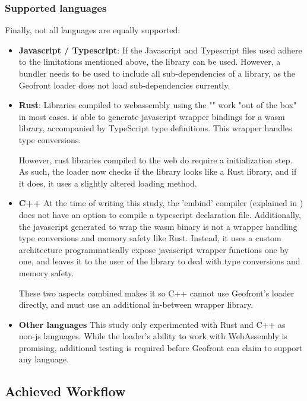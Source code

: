 \subsubsection*{Supported languages}
Finally, not all languages are equally supported:

\begin{itemize}[-]
  \item \textbf{Javascript / Typescript}: 
    If the Javascript and Typescript files used adhere to the limitations mentioned above, the library can be used. 
    However, a bundler needs to be used to include all sub-dependencies of a library, as the Geofront loader does not load sub-dependencies currently. 

  \item \textbf{Rust}:
    Libraries compiled to webassembly using the "" work "out of the box" in most cases.
     is able to generate javascript wrapper bindings for a \ac{wasm} library, accompanied by TypeScript type definitions. 
    This wrapper handles type conversions. 
    
    However, rust libraries compiled to the web do require a initialization step. 
    As such, the loader now checks if the library looks like a Rust library, and if it does, it uses a slightly altered loading method.
  \item \textbf{C++}
    At the time of writing this study, the 'embind' compiler (explained in ) does not have an option to compile a typescript declaration file. 
    Additionally, the javascript generated to wrap the wasm binary is not a wrapper handling type conversions and memory safety like Rust. 
    Instead, it uses a custom architecture programmatically expose javascript wrapper functions one by one, and leaves it to the user of the library to deal with type conversions and memory safety. 
    
    These two aspects combined makes it so C++ cannot use Geofront's loader directly, and must use an additional in-between wrapper library.

  \item \textbf{Other languages}
    This study only experimented with Rust and C++ as non-js languages.
    While the loader's ability to work with WebAssembly is promising, additional testing is required before Geofront can claim to support any language. 
\end{itemize}


\subsection{Achieved Workflow}

